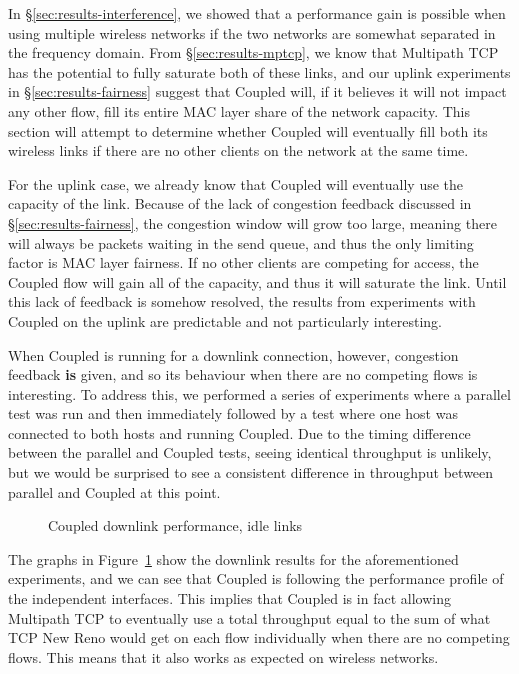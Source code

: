 In \S\ref{sec:results-interference}, we showed that a performance gain is
possible when using multiple wireless networks if the two networks are somewhat
separated in the frequency domain. From \S\ref{sec:results-mptcp}, we know that
Multipath TCP has the potential to fully saturate both of these links, and our
uplink experiments in \S\ref{sec:results-fairness} suggest that Coupled will, if
it believes it will not impact any other flow, fill its entire MAC layer share
of the network capacity. This section will attempt to determine whether Coupled
will eventually fill both its wireless links if there are no other clients on
the network at the same time.

For the uplink case, we already know that Coupled will eventually use the
capacity of the link. Because of the lack of congestion feedback discussed in
\S\ref{sec:results-fairness}, the congestion window will grow too large, meaning
there will always be packets waiting in the send queue, and thus the only
limiting factor is MAC layer fairness. If no other clients are competing for
access, the Coupled flow will gain all of the capacity, and thus it will
saturate the link. Until this lack of feedback is somehow resolved, the results
from experiments with Coupled on the uplink are predictable and not particularly
interesting.

When Coupled is running for a downlink connection, however, congestion feedback
\textbf{is} given, and so its behaviour when there are no competing flows is
interesting. To address this, we performed a series of experiments where a
parallel test was run and then immediately followed by a test where one host was
connected to both hosts and running Coupled. Due to the timing difference
between the parallel and Coupled tests, seeing identical throughput is unlikely,
but we would be surprised to see a consistent difference in throughput between
parallel and Coupled at this point.

\begin{figure}[h]
 \centering
 
 \caption{Coupled downlink performance, idle links}\label{graph:coupled-performance}
\end{figure}

The graphs in Figure~\ref{graph:coupled-performance} show the downlink results
for the aforementioned experiments, and we can see that Coupled is following the
performance profile of the independent interfaces. This implies that Coupled is
in fact allowing Multipath TCP to eventually use a total throughput equal to the
sum of what TCP New Reno would get on each flow individually when there are no
competing flows. This means that it also works as expected on wireless networks.
